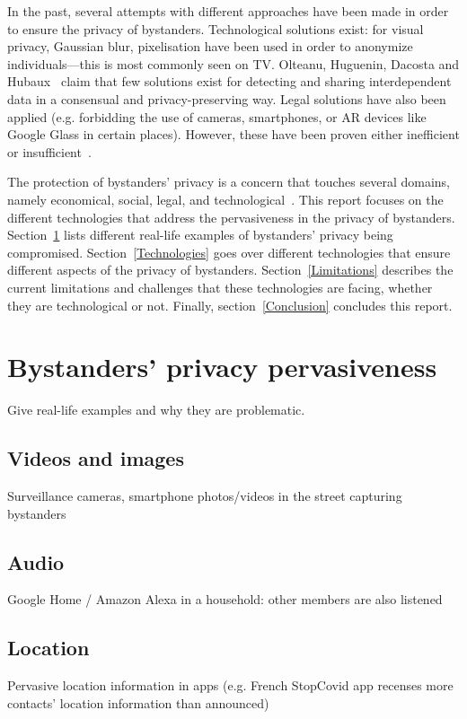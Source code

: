 \documentclass[conference]{IEEEtran}
\begin{document}
In the past, several attempts with different approaches have been made in order to ensure the privacy of bystanders. Technological solutions exist: for visual privacy, Gaussian blur, pixelisation \cite{dufaux2010framework} have been used in order to anonymize individuals---this is most commonly seen on TV. Olteanu, Huguenin, Dacosta and Hubaux~\cite{olteanu2018consensual} claim that few solutions exist for detecting and sharing interdependent data in a consensual and privacy-preserving way. Legal solutions have also been applied (e.g. forbidding the use of cameras, smartphones, or \ac{AR} devices like Google Glass in certain places\cite{shu2016cardea}). However, these have been proven either inefficient or insufficient~\cite{shu2016cardea, olteanu2018consensual, dufaux2010framework}. 

The protection of bystanders' privacy is a concern that touches several domains, namely economical, social, legal, and technological~\cite{lu2017privacy}. This report focuses on the different technologies that address the pervasiveness in the privacy of bystanders. Section~\ref{BystandersPrivacy} lists different real-life examples of bystanders' privacy being compromised. Section~\ref{Technologies} goes over different technologies that ensure different aspects of the privacy of bystanders. Section~\ref{Limitations} describes the current limitations and challenges that these technologies are facing, whether they are technological or not. Finally, section~\ref{Conclusion} concludes this report.

\section{Bystanders’ privacy pervasiveness}\label{BystandersPrivacy}
Give real-life examples and why they are problematic.
\subsection{Videos and images}
Surveillance cameras, smartphone photos/videos in the street capturing bystanders
\subsection{Audio}
Google Home / Amazon Alexa in a household: other members are also listened
\subsection{Location}
Pervasive location information in apps (e.g. French StopCovid app recenses more contacts’ location information than announced)
\end{document}
